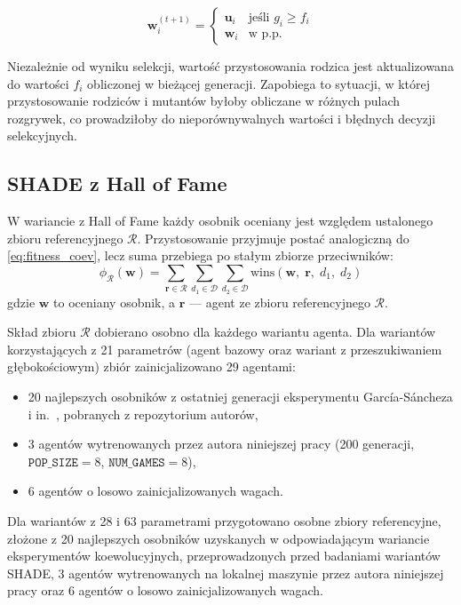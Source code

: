 \begin{equation}
    \mathbf{w}_i^{(t+1)} =
    \begin{cases}
        \mathbf{u}_i & \text{jeśli } g_i \geq f_i \\
        \mathbf{w}_i & \text{w p.p.}
    \end{cases}
\end{equation}

Niezależnie od wyniku selekcji, wartość przystosowania rodzica jest aktualizowana do wartości $f_i$ obliczonej w bieżącej generacji. Zapobiega to sytuacji, w której przystosowanie rodziców i mutantów byłoby obliczane w różnych pulach rozgrywek, co prowadziłoby do nieporównywalnych wartości i błędnych decyzji selekcyjnych.

\subsection{SHADE z Hall of Fame} \label{sec:shade_hof}

W wariancie z Hall of Fame każdy osobnik oceniany jest względem ustalonego zbioru referencyjnego $\mathcal{R}$. Przystosowanie przyjmuje postać analogiczną do \eqref{eq:fitness_coev}, lecz suma przebiega po stałym zbiorze przeciwników:
\begin{equation}
    \phi_{\mathcal{R}}(\mathbf{w}) =
        \sum_{\mathbf{r} \in \mathcal{R}}
        \sum_{d_1 \in \mathcal{D}} \sum_{d_2 \in \mathcal{D}}
        \text{wins}(\mathbf{w},\; \mathbf{r},\; d_1,\; d_2)
    \label{eq:fitness_hof}
\end{equation}
gdzie $\mathbf{w}$ to oceniany osobnik, a $\mathbf{r}$ --- agent ze zbioru referencyjnego $\mathcal{R}$.

Skład zbioru $\mathcal{R}$ dobierano osobno dla każdego wariantu agenta. Dla wariantów korzystających z 21 parametrów (agent bazowy oraz wariant z przeszukiwaniem głębokościowym) zbiór zainicjalizowano 29 agentami:
\begin{itemize}
    \item 20 najlepszych osobników z ostatniej generacji eksperymentu García-Sáncheza i in.~\cite{sanchez2020}, pobranych z repozytorium autorów,
    \item 3 agentów wytrenowanych przez autora niniejszej pracy (200 generacji, $\texttt{POP\_SIZE} = 8$, $\texttt{NUM\_GAMES} = 8$),
    \item 6 agentów o losowo zainicjalizowanych wagach.
\end{itemize}
Dla wariantów z 28 i 63 parametrami przygotowano osobne zbiory referencyjne, złożone z 20 najlepszych osobników uzyskanych w odpowiadającym wariancie eksperymentów koewolucyjnych, przeprowadzonych przed badaniami wariantów SHADE, 3 agentów wytrenowanych na lokalnej maszynie przez autora niniejszej pracy oraz 6 agentów o losowo zainicjalizowanych wagach.

